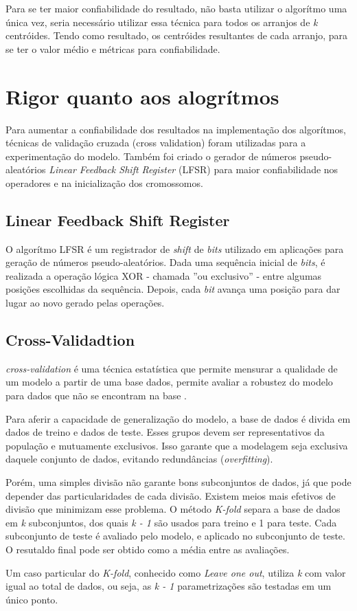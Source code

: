 Para se ter maior confiabilidade do resultado, não basta utilizar o algorítmo uma 
única vez, seria necessário utilizar essa técnica para todos os arranjos de {\it k} 
centróides. Tendo como resultado, os centróides resultantes de cada arranjo, para 
se ter o valor médio e métricas para confiabilidade.

\section{Rigor quanto aos alogrítmos}
Para aumentar a confiabilidade dos resultados na implementação dos algorítmos, 
técnicas de validação cruzada (cross validation) foram utilizadas para a
experimentação do modelo. Também foi criado o gerador de números pseudo-aleatórios
{\it Linear Feedback Shift Register} (LFSR) para maior confiabilidade nos 
operadores e na inicialização dos cromossomos.

\subsection{Linear Feedback Shift Register}
O algorítmo LFSR é um registrador de {\it shift } de {\it bits} utilizado em 
aplicações para geração de números pseudo-aleatórios. Dada uma sequência inicial 
de {\it bits}, é realizada a operação lógica XOR - chamada ''ou exclusivo'' - entre
algumas posições escolhidas da sequência. Depois, cada {\it bit} avança uma posição
para dar lugar ao novo gerado pelas operações.

\subsection{Cross-Validadtion}
{\it cross-validation} é uma técnica estatística que permite mensurar a qualidade de um modelo a partir de uma base dados, permite avaliar a robustez do modelo para dados que não se encontram na base \cite{cross_val}. 

Para aferir a capacidade de generalização do modelo, a base de dados é divida em dados de treino e dados de teste. Esses grupos devem ser representativos da população e mutuamente exclusivos. Isso garante que a modelagem seja exclusiva daquele conjunto de dados, evitando redundâncias ({\it overfitting}).

Porém, uma simples divisão não garante bons subconjuntos de dados, já que pode depender das particularidades de cada divisão. Existem meios mais efetivos de divisão que minimizam esse problema. O método {\it K-fold} separa a base de dados em {\it k} subconjuntos, dos quais {\it k - 1} são usados para treino e 1 para teste. Cada subconjunto de teste é avaliado pelo modelo, e aplicado no subconjunto de teste. O resutaldo final pode ser obtido como a média entre as avaliações. 

Um caso particular do {\it K-fold}, conhecido como {\it Leave one out}, utiliza {\it k} com valor igual ao total de dados, ou seja, as {\it k - 1} parametrizações são testadas em um único ponto.